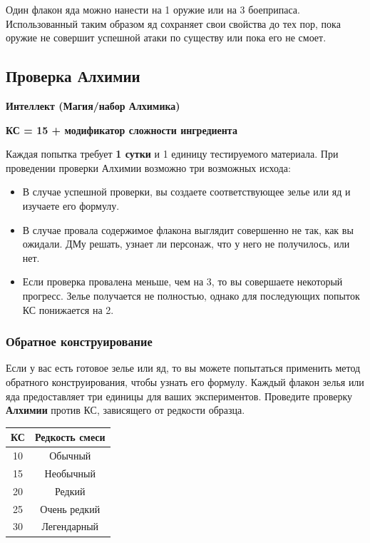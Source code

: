 \documentclass[a4paper, 9pt, twocolumn]{book}
\begin{document}
	Один флакон яда можно нанести на 1 оружие или на 3 боеприпаса. Использованный таким образом яд сохраняет свои свойства до тех пор, пока оружие не совершит успешной атаки по существу или пока его не смоет.
	
	\subsection{Проверка Алхимии}
	
	\textbf{Интеллект (Магия/набор Алхимика)}
	
	\textbf{КС = 15 + модификатор сложности ингредиента}
	
	Каждая попытка требует \textbf{1 сутки} и 1 единицу тестируемого материала. При проведении проверки Алхимии возможно три возможных исхода:
	
	\begin{itemize}
		\item В случае успешной проверки, вы создаете соответствующее зелье или яд и изучаете его формулу.
		
		\item В случае провала содержимое флакона выглядит совершенно не так, как вы ожидали. ДМу решать, узнает ли персонаж, что у него не получилось, или нет.
		
		\item Если проверка провалена меньше, чем на 3, то вы совершаете некоторый прогресс. Зелье получается не полностью, однако для последующих попыток КС понижается на 2.
	\end{itemize}

	\subsubsection{Обратное конструирование}
	
	Если у вас есть готовое зелье или яд, то вы можете попытаться применить метод обратного конструирования, чтобы узнать его формулу. Каждый флакон зелья или яда предоставляет три единицы для ваших экспериментов. Проведите проверку \textbf{Алхимии} против КС, зависящего от редкости образца.
	
	\begin{tabular}{|c|c|}
		\hline
		\textbf{КС} & \textbf{Редкость смеси} \\
		\hline
		10 & Обычный \\
		\hline
		15 & Необычный \\
		\hline
		20 & Редкий \\
		\hline
		25 & Очень редкий \\
		\hline
		30 & Легендарный \\
		\hline
	\end{tabular}
	
\end{document}
